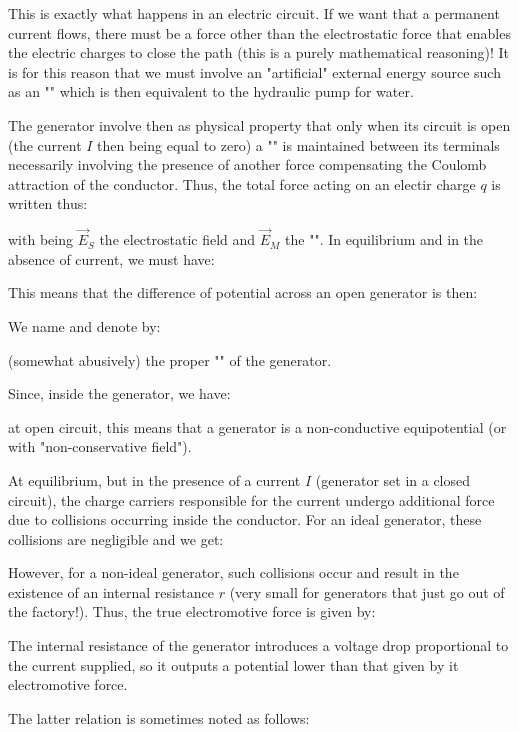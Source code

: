 	This is exactly what happens in an electric circuit. If we want that a permanent current flows, there must be a force other than the electrostatic force that enables the electric charges to close the path (this is a purely mathematical reasoning)! It is for this reason that we must involve an "artificial" external energy source such as an "" which is then equivalent to the hydraulic pump for water.
	
	The generator involve then as physical property that only when its circuit is open (the current $I$ then being equal to zero) a "" is maintained between its terminals necessarily involving the presence of another force compensating the Coulomb attraction of the conductor. Thus, the total force acting on an electir charge $q$ is written thus:
	
	with being $\vec{E}_S$ the electrostatic field and $\vec{E}_M$ the "". In equilibrium and in the absence of current, we must have:
	
	This means that the difference of potential across an open generator is then:
	
	We name and denote by:
	
	(somewhat abusively) the proper "" of the generator.
	
	Since, inside the generator, we have:
	
	at open circuit, this means that a generator is a non-conductive equipotential (or with "non-conservative field").

	At equilibrium, but in the presence of a current $I$ (generator set in a closed circuit), the charge carriers responsible for the current undergo additional force due to collisions occurring inside the conductor. For an ideal generator, these collisions are negligible and we get:
	
	However, for a non-ideal generator, such collisions occur and result in the existence of an internal resistance $r$ (very small for generators that just go out of the factory!). Thus, the true electromotive force is given by:
	
	The internal resistance of the generator introduces a voltage drop proportional to the current supplied, so it outputs a potential lower than that given by it electromotive force.
	
	The latter relation is sometimes noted as follows:
	
